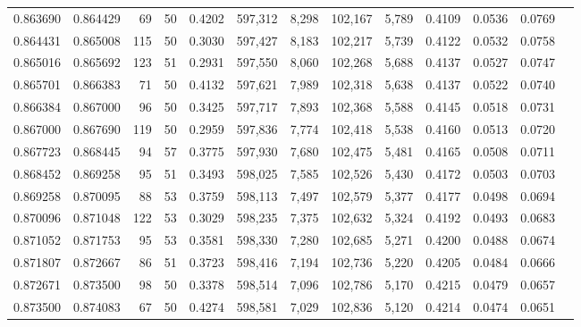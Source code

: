 \begin{tabular}{rrrrrrrrrrrrr}
0.863690 & 0.864429 &    69 &  50 &                                     0.4202 & 597,312 &   8,298 & 102,167 &   5,789 & 0.4109 & 0.0536 & 0.0769 \\
0.864431 & 0.865008 &   115 &  50 &                                     0.3030 & 597,427 &   8,183 & 102,217 &   5,739 & 0.4122 & 0.0532 & 0.0758 \\
0.865016 & 0.865692 &   123 &  51 &                                     0.2931 & 597,550 &   8,060 & 102,268 &   5,688 & 0.4137 & 0.0527 & 0.0747 \\
0.865701 & 0.866383 &    71 &  50 &                                     0.4132 & 597,621 &   7,989 & 102,318 &   5,638 & 0.4137 & 0.0522 & 0.0740 \\
0.866384 & 0.867000 &    96 &  50 &                                     0.3425 & 597,717 &   7,893 & 102,368 &   5,588 & 0.4145 & 0.0518 & 0.0731 \\
0.867000 & 0.867690 &   119 &  50 &                                     0.2959 & 597,836 &   7,774 & 102,418 &   5,538 & 0.4160 & 0.0513 & 0.0720 \\
0.867723 & 0.868445 &    94 &  57 &                                     0.3775 & 597,930 &   7,680 & 102,475 &   5,481 & 0.4165 & 0.0508 & 0.0711 \\
0.868452 & 0.869258 &    95 &  51 &                                     0.3493 & 598,025 &   7,585 & 102,526 &   5,430 & 0.4172 & 0.0503 & 0.0703 \\
0.869258 & 0.870095 &    88 &  53 &                                     0.3759 & 598,113 &   7,497 & 102,579 &   5,377 & 0.4177 & 0.0498 & 0.0694 \\
0.870096 & 0.871048 &   122 &  53 &                                     0.3029 & 598,235 &   7,375 & 102,632 &   5,324 & 0.4192 & 0.0493 & 0.0683 \\
0.871052 & 0.871753 &    95 &  53 &                                     0.3581 & 598,330 &   7,280 & 102,685 &   5,271 & 0.4200 & 0.0488 & 0.0674 \\
0.871807 & 0.872667 &    86 &  51 &                                     0.3723 & 598,416 &   7,194 & 102,736 &   5,220 & 0.4205 & 0.0484 & 0.0666 \\
0.872671 & 0.873500 &    98 &  50 &                                     0.3378 & 598,514 &   7,096 & 102,786 &   5,170 & 0.4215 & 0.0479 & 0.0657 \\
0.873500 & 0.874083 &    67 &  50 &                                     0.4274 & 598,581 &   7,029 & 102,836 &   5,120 & 0.4214 & 0.0474 & 0.0651 \\

\end{tabular}
